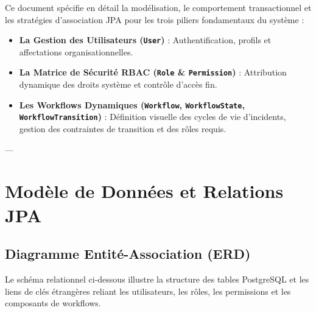 \documentclass[11pt,a4paper]{article}
\begin{document}
Ce document spécifie en détail la modélisation, le comportement transactionnel et les stratégies d'association JPA pour les trois piliers fondamentaux du système :
\begin{itemize}
    \item \textbf{La Gestion des Utilisateurs (\texttt{User})} : Authentification, profils et affectations organisationnelles.
    \item \textbf{La Matrice de Sécurité RBAC (\texttt{Role} \& \texttt{Permission})} : Attribution dynamique des droits système et contrôle d'accès fin.
    \item \textbf{Les Workflows Dynamiques (\texttt{Workflow}, \texttt{WorkflowState}, \texttt{WorkflowTransition})} : Définition visuelle des cycles de vie d'incidents, gestion des contraintes de transition et des rôles requis.
\end{itemize}

---

\section{Modèle de Données et Relations JPA}

\subsection{Diagramme Entité-Association (ERD)}

Le schéma relationnel ci-dessous illustre la structure des tables PostgreSQL et les liens de clés étrangères reliant les utilisateurs, les rôles, les permissions et les composants de workflows.
\end{document}
